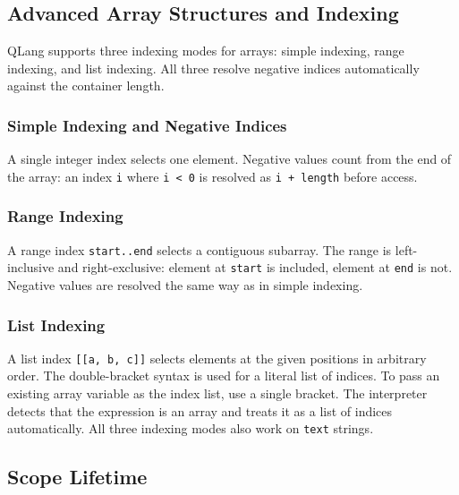 \subsection{Advanced Array Structures and Indexing}
\label{sec:array-indexing}

QLang supports three indexing modes for arrays: simple indexing, range indexing,
and list indexing. All three resolve negative indices automatically against the
container length.

\subsubsection{Simple Indexing and Negative Indices}
A single integer index selects one element. Negative values count from the end
of the array: an index \texttt{i} where \texttt{i < 0} is resolved as
\texttt{i + length} before access.



\subsubsection{Range Indexing}
A range index \texttt{start..end} selects a contiguous subarray. The range is
left-inclusive and right-exclusive: element at \texttt{start} is included,
element at \texttt{end} is not. Negative values are resolved the same way as
in simple indexing.


\newpage
\subsubsection{List Indexing}
A list index \texttt{[[a, b, c]]} selects elements at the given positions in
arbitrary order. The double-bracket syntax is used for a literal list
of indices. To pass an existing array variable as the index list, use a
single bracket. The interpreter detects that the expression is an array
and treats it as a list of indices automatically. All three indexing modes
also work on \texttt{text} strings.



\subsection{Scope Lifetime}
\label{sec:scope-lifetime}

